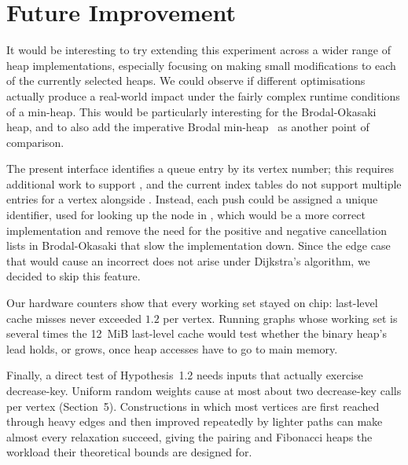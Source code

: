 \section{Future Improvement}

It would be interesting to try extending this experiment across a wider range of
heap implementations, especially focusing on making small modifications to each
of the currently selected heaps. We could observe if different optimisations
actually produce a real-world impact under the fairly complex runtime
conditions of a min-heap. This would be particularly interesting for the
Brodal-Okasaki heap, and to also add the imperative Brodal min-heap~\cite{brodal1996worst} as another point
of comparison.

The present interface identifies a queue entry by its vertex number; this
requires additional work to support , and the current
index tables do not support multiple entries for a vertex alongside
. Instead, each push could be assigned a unique
identifier, used for looking up the node in , which would
be a more correct implementation and remove the need for the positive and
negative cancellation lists in Brodal-Okasaki that slow the implementation down.
Since the edge case that would cause an incorrect 
does not arise under Dijkstra's algorithm, we decided to skip this feature.

Our hardware counters show that every working set stayed on chip: last-level
cache misses never exceeded $1.2$ per vertex. Running graphs whose working set
is several times the 12~MiB last-level cache would test whether the binary
heap's lead holds, or grows, once heap accesses have to go to main memory.

Finally, a direct test of Hypothesis~1.2 needs inputs that actually exercise
decrease-key. Uniform random weights cause at most about two decrease-key calls
per vertex (Section~5). Constructions in which most vertices are first reached
through heavy edges and then improved repeatedly by lighter paths can make
almost every relaxation succeed, giving the pairing and Fibonacci heaps the
workload their theoretical bounds are designed for.
